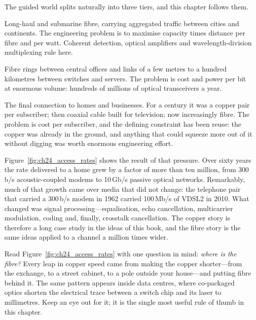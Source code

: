 The guided world splits naturally into three tiers, and this chapter follows them.
\begin{description}[style=nextline,leftmargin=1.2em,font=\sffamily\bfseries\small\color{navy}]
\item[The core.] Long-haul and submarine fibre, carrying aggregated traffic between cities
and continents. The engineering problem is to maximise capacity times distance per fibre and
per watt. Coherent detection, optical amplifiers and wavelength-division multiplexing rule
here.
\item[The metro and data centre.] Fibre rings between central offices and links of a few
metres to a hundred kilometres between switches and servers. The problem is cost and power
per bit at enormous volume: hundreds of millions of optical transceivers a year.
\item[The access network, or ``last mile''.] The final connection to homes and businesses.
For a century it was a copper pair per subscriber; then coaxial cable built for television;
now increasingly fibre. The problem is cost per subscriber, and the defining constraint has
been reuse: the copper was already in the ground, and anything that could squeeze more out of
it without digging was worth enormous engineering effort.
\end{description}



Figure~\ref{fig:ch24_access_rates} shows the result of that pressure. Over sixty years the
rate delivered to a home grew by a factor of more than ten million, from 300\,b/s
acoustic-coupled modems to 10\,Gb/s passive optical networks. Remarkably, much of that growth
came over media that did not change: the telephone pair that carried a 300\,b/s modem in 1962
carried 100\,Mb/s of VDSL2 in 2010. What changed was signal processing---equalisation, echo
cancellation, multicarrier modulation, coding and, finally, crosstalk cancellation. The copper
story is therefore a long case study in the ideas of this book, and the fibre story is the same
ideas applied to a channel a million times wider.


\begin{keyidea}
Read Figure~\ref{fig:ch24_access_rates} with one question in mind: \emph{where is the fibre?}
Every leap in copper speed came from making the copper shorter---from the exchange, to a street
cabinet, to a pole outside your house---and putting fibre behind it. The same pattern appears
inside data centres, where co-packaged optics shorten the electrical trace between a switch chip
and its laser to millimetres. Keep an eye out for it; it is the single most useful rule of thumb
in this chapter.
\end{keyidea}


